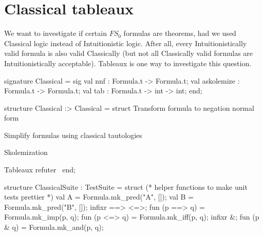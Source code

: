 
\section{Classical tableaux}

\begin{node}
We want to investigate if certain $FS_{0}$ formulas are theorems, had
we used Classical logic instead of Intuitionistic logic. After all,
every Intuitionistically valid formula is also valid Classically (but
not all Classically valid formulas are Intuitionistically acceptable).
Tableaux is one way to investigate this question.
\end{node}

\nwenddocs{}\endmoddef\nwstartdeflinemarkup\nwenddeflinemarkup
signature Classical = sig
  val nnf : Formula.t -> Formula.t;
  val askolemize : Formula.t -> Formula.t;
  val tab : Formula.t -> int -> int;
end;
\nwendcode{}\nwdocspar

\nwenddocs{}\endmoddef\nwstartdeflinemarkup\nwenddeflinemarkup
structure Classical :> Classical = struct
\LA{}Transform formula to negation normal form~{\nwtagstyle{}}\RA{}

\LA{}Simplify formulas using classical tautologies~{\nwtagstyle{}}\RA{}

\LA{}Skolemization~{\nwtagstyle{}}\RA{}

\LA{}Tableaux refuter~{\nwtagstyle{}}\RA{}
end;
\nwendcode{}\nwdocspar

\nwenddocs{}\endmoddef\nwstartdeflinemarkup\nwenddeflinemarkup
structure ClassicalSuite : TestSuite = struct
(* helper functions to make unit tests prettier *)
val A = Formula.mk_pred("A", []);
val B = Formula.mk_pred("B", []);
infixr ==> <=>;
fun (p ==> q) = Formula.mk_imp(p, q);
fun (p <=> q) = Formula.mk_iff(p, q);
infixr &;
fun (p & q) = Formula.mk_and(p, q);

